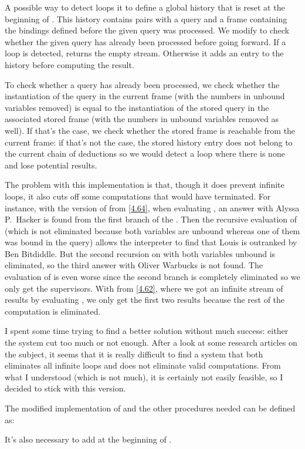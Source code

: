 \begin{exe}[4.67]
    A possible way to detect loops it to define a global history that is reset 
    at the beginning of . This history contains pairs 
    with a query and a frame containing the bindings defined before the given 
    query was processed. We modify  to check whether the 
    given query has already been processed before going forward. If a loop is 
    detected,  returns the empty stream. Otherwise it adds an 
    entry to the history before computing the result.

    To check whether a query has already been processed, we check whether the 
    instantiation of the query in the current frame (with the numbers in unbound 
    variables removed) is equal to the instantiation of the stored query in the 
    associated stored frame (with the numbers in unbound variables removed as 
    well). If that’s the case, we check whether the stored frame is reachable 
    from the current frame: if that’s not the case, the stored history entry 
    does not belong to the current chain of deductions so we would detect a loop 
    where there is none and lose potential results.

    The problem with this implementation is that, though it does prevent 
    infinite loops, it also cuts off some computations that would have 
    terminated. For instance, with the version of  from 
    \autoref{4.64}, when evaluating
    , an answer with Alyssa P.~Hacker 
    is found from the first branch of the . Then the recursive 
    evaluation of  (which is not eliminated because both 
    variables are unbound whereas one of them was bound in the query) allows the 
    interpreter to find that Louis is outranked by Ben Bitdiddle. But the second 
    recursion on  with both variables unbound is eliminated, 
    so the third answer with Oliver Warbucks is not found. The evaluation of 
     is even worse since the second branch is 
    completely eliminated so we only get the supervisors. With  
    from \autoref{4.62}, where we got an infinite stream of results by 
    evaluating , we only get the first two results 
    because the rest of the computation is eliminated.

    I spent some time trying to find a better solution without much success: 
    either the system cut too much or not enough. After a look at some research 
    articles on the subject, it seems that it is really difficult to find 
    a system that both eliminates all infinite loops and does not eliminate 
    valid computations. From what I understood (which is not much), it is 
    certainly not easily feasible, so I decided to stick with this version.

    The modified implementation of  and the other procedures 
    needed can be defined as:

    It’s also necessary to add  at the beginning of 
    .
\end{exe}

